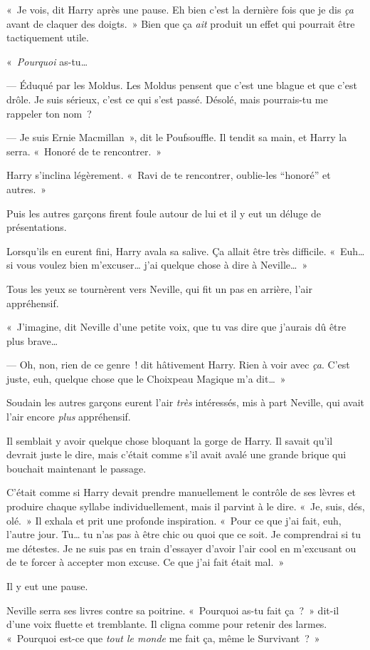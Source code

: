 «~Je vois, dit Harry après une pause. Eh bien c'est la dernière fois que je dis \emph{ça} avant de claquer des doigts.~» Bien que ça \emph{ait} produit un effet qui pourrait être tactiquement utile.

«~\emph{Pourquoi} as-tu…

--- Éduqué par les Moldus. Les Moldus pensent que c'est une blague et que c'est drôle. Je suis sérieux, c'est ce qui s'est passé. Désolé, mais pourrais-tu me rappeler ton nom~?

--- Je suis Ernie Macmillan~», dit le Poufsouffle. Il tendit sa main, et Harry la serra. «~Honoré de te rencontrer.~»

Harry s'inclina légèrement. «~Ravi de te rencontrer, oublie-les “honoré” et autres.~»

Puis les autres garçons firent foule autour de lui et il y eut un déluge de présentations.

Lorsqu'ils en eurent fini, Harry avala sa salive. Ça allait être très difficile. «~Euh… si vous voulez bien m'excuser… j'ai quelque chose à dire à Neville…~»

Tous les yeux se tournèrent vers Neville, qui fit un pas en arrière, l'air appréhensif.

«~J'imagine, dit Neville d'une petite voix, que tu vas dire que j'aurais dû être plus brave…

--- Oh, non, rien de ce genre~! dit hâtivement Harry. Rien à voir avec \emph{ça}. C'est juste, euh, quelque chose que le Choixpeau Magique m'a dit…~»

Soudain les autres garçons eurent l'air \emph{très} intéressés, mis à part Neville, qui avait l'air encore \emph{plus} appréhensif.

Il semblait y avoir quelque chose bloquant la gorge de Harry. Il savait qu'il devrait juste le dire, mais c'était comme s'il avait avalé une grande brique qui bouchait maintenant le passage.

C'était comme si Harry devait prendre manuellement le contrôle de ses lèvres et produire chaque syllabe individuellement, mais il parvint à le dire. «~Je, suis, dés, olé.~» Il exhala et prit une profonde inspiration. «~Pour ce que j'ai fait, euh, l'autre jour. Tu… tu n'as pas à être chic ou quoi que ce soit. Je comprendrai si tu me détestes. Je ne suis pas en train d'essayer d'avoir l'air cool en m'excusant ou de te forcer à accepter mon excuse. Ce que j'ai fait était mal.~»

Il y eut une pause.

Neville serra ses livres contre sa poitrine. «~Pourquoi as-tu fait ça~?~» dit-il d'une voix fluette et tremblante. Il cligna comme pour retenir des larmes. «~Pourquoi est-ce que \emph{tout le monde} me fait ça, même le Survivant~?~»

